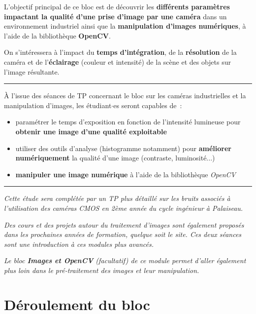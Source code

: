 \documentclass[a4paper,11pt,titlepage]{article} %
\begin{document}
L'objectif principal de ce bloc est de découvrir les \textbf{différents paramètres impactant la qualité d'une prise d'image par une caméra} dans un environnement industriel ainsi que la \textbf{manipulation d'images numériques}, à l'aide de la bibliothèque \textbf{OpenCV}.

On s'intéressera à l'impact du \textbf{temps d'intégration}, de la \textbf{résolution} de la caméra et de l'\textbf{éclairage} (couleur et intensité) de la scène et des objets sur l'image résultante. 


\noindent \rule{\linewidth}{1pt}

\medskip


À l'issue des séances de TP concernant le bloc sur les caméras industrielles et la manipulation d'images, les étudiant$\cdot$es seront capables de~:

\begin{itemize}
	\item paramétrer le temps d'exposition en fonction de l'intensité lumineuse pour \textbf{obtenir une image d'une qualité exploitable}
	\item utiliser des outils d'analyse (histogramme notamment) pour \textbf{améliorer numériquement} la qualité d'une image (contraste, luminosité...)
	\item \textbf{manipuler une image numérique} à l'aide de la bibliothèque \textsl{OpenCV}
\end{itemize}

\noindent \rule{\linewidth}{1pt}


\textit{Cette étude sera complétée par un TP plus détaillé sur les bruits associés à l'utilisation des caméras CMOS en 2ème année du cycle ingénieur à Palaiseau.}

\textit{Des cours et des projets autour du traitement d'images sont également proposés dans les prochaines années de formation, quelque soit le site. Ces deux séances sont une introduction à ces modules plus avancés.}

\textit{Le bloc \textbf{Images et OpenCV} (facultatif) de ce module permet d'aller également plus loin dans le pré-traitement des images et leur manipulation.}


\newpage
\section{Déroulement du bloc}
\end{document}
